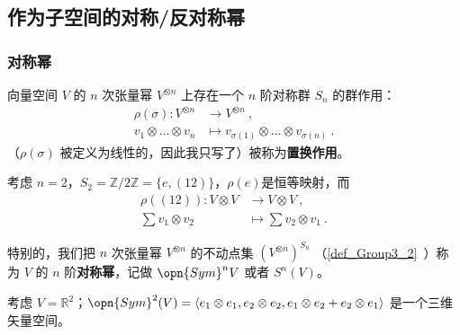 
\begin{issues}
\issueTODO
\issueDraft
{}
\end{issues}



\subsection{作为子空间的对称/反对称幂}

\subsubsection{对称幂}

向量空间 $V$ 的 $n$ 次张量幂 $V^{\otimes n}$ 上存在一个 $n$ 阶对称群 $S_n$ 的群作用：
\begin{equation}
\begin{aligned}
\rho(\sigma): V^{\otimes n} &\to V^{\otimes n}~, \\
v_1 \otimes \dots \otimes v_n &\mapsto v_{\sigma(1)} \otimes \dots \otimes v_{\sigma(n)}~.
\end{aligned}
\end{equation}
（$\rho(\sigma)$ 被定义为线性的，因此我只写了）被称为\textbf{置换作用}。

\begin{example}{}
考虑 $n = 2$，$S_2 = \mathbb{Z}/2\mathbb{Z} = \{e, (1 2)\}$，$\rho(e)$是恒等映射，而
\begin{equation}
\begin{aligned}
\rho((1 2)): V \otimes V &\to V \otimes V~, \\
\sum v_1 \otimes v_2 &\mapsto \sum v_2 \otimes v_1~.
\end{aligned}
\end{equation}
\end{example}

特别的，我们把 $n$ 次张量幂 $V^{\otimes n}$ 的不动点集 $(V^{\otimes n})^{S_n}$ （\autoref{def_Group3_2}~）称为 $V$ 的 $n$ 阶\textbf{对称幂}，记做 $\opn{Sym}^n V$ 或者 $S^n(V)$。

\begin{example}{}\label{ex_vecSAS_1}
考虑 $V = \mathbb{R}^2$；$\opn{Sym}^2(V) = \langle e_1 \otimes e_1, e_2 \otimes e_2, e_1 \otimes e_2 + e_2 \otimes e_1 \rangle$ 是一个三维矢量空间。
\end{example}

